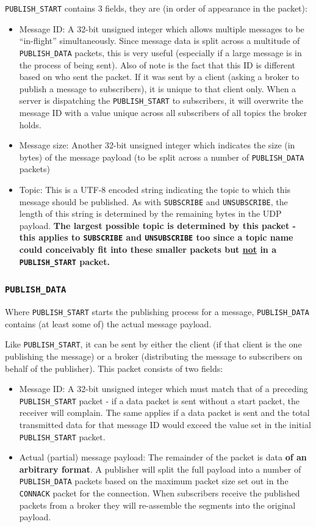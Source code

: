 \documentclass[a4paper]{article}
\numberwithin{figure}{section}
\numberwithin{table}{section}
\newcommand{\mi}{\mintinline}
\begin{document}
\mi{c}{PUBLISH_START} contains 3 fields, they are (in order of appearance in the packet):
\begin{itemize}
	\item Message ID: A 32-bit unsigned integer which allows multiple messages to be ``in-flight'' simultaneously. Since message data is split across a multitude of \mi{c}{PUBLISH_DATA} packets, this is very useful (especially if a large message is in the process of being sent). Also of note is the fact that this ID is different based on who sent the packet. If it was sent by a client (asking a broker to publish a message to subscribers), it is unique to that client only. When a server is dispatching the \mi{c}{PUBLISH_START} to subscribers, it will overwrite the message ID with a value unique across all subscribers of all topics the broker holds.
	\item Message size: Another 32-bit unsigned integer which indicates the size (in bytes) of the message payload (to be split across a number of \mi{c}{PUBLISH_DATA} packets)
	\item Topic: This is a UTF-8 encoded string indicating the topic to which this message should be published. As with \mi{c}{SUBSCRIBE} and \mi{c}{UNSUBSCRIBE}, the length of this string is determined by the remaining bytes in the UDP payload. \textbf{The largest possible topic is determined by this packet - this applies to \mi{c}{SUBSCRIBE} and \mi{c}{UNSUBSCRIBE} too since a topic name could conceivably fit into these smaller packets but \underline{not} in a \mi{c}{PUBLISH_START} packet.}
\end{itemize}

\subsubsection{\mi{c}{PUBLISH_DATA}}
Where \mi{c}{PUBLISH_START} starts the publishing process for a message, \mi{c}{PUBLISH_DATA} contains (at least some of) the actual message payload.

Like \mi{c}{PUBLISH_START}, it can be sent by either the client (if that client is the one publishing the message) or a broker (distributing the message to subscribers on behalf of the publisher). This packet consists of two fields:
\begin{itemize}
	\item Message ID: A 32-bit unsigned integer which must match that of a preceding \mi{c}{PUBLISH_START} packet - if a data packet is sent without a start packet, the receiver will complain. The same applies if a data packet is sent and the total transmitted data for that message ID would exceed the value set in the initial \mi{c}{PUBLISH_START} packet.
	\item Actual (partial) message payload: The remainder of the packet is data \textbf{of an arbitrary format}. A publisher will split the full payload into a number of \mi{c}{PUBLISH_DATA} packets based on the maximum packet size set out in the \mi{c}{CONNACK} packet for the connection. When subscribers receive the published packets from a broker they will re-assemble the segments into the original payload.
\end{itemize}

\clearpage
{}
{}
\printbibliography
\end{document}
